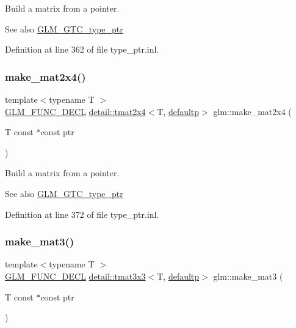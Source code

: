 Build a matrix from a pointer. \begin{DoxySeeAlso}{See also}
\hyperlink{group__gtc__type__ptr}{G\+L\+M\+\_\+\+G\+T\+C\+\_\+type\+\_\+ptr} 
\end{DoxySeeAlso}


Definition at line 362 of file type\+\_\+ptr.\+inl.

\mbox{\label{group__gtc__type__ptr_ga174a43e8913682834de9cd918e36df25}} 
\subsubsection{\texorpdfstring{make\+\_\+mat2x4()}{make\_mat2x4()}}
{\footnotesize\ttfamily template$<$typename T $>$ \\
\hyperlink{setup_8hpp_ab2d052de21a70539923e9bcbf6e83a51}{G\+L\+M\+\_\+\+F\+U\+N\+C\+\_\+\+D\+E\+CL} \hyperlink{structglm_1_1detail_1_1tmat2x4}{detail\+::tmat2x4}$<$T, \hyperlink{namespaceglm_a0f04f086094c747d227af4425893f545a9d21ccd8b5a009ec7eb7677befc3bf51}{defaultp}$>$ glm\+::make\+\_\+mat2x4 (\begin{DoxyParamCaption}\item[{T const $\ast$const}]{ptr }\end{DoxyParamCaption})}

Build a matrix from a pointer. \begin{DoxySeeAlso}{See also}
\hyperlink{group__gtc__type__ptr}{G\+L\+M\+\_\+\+G\+T\+C\+\_\+type\+\_\+ptr} 
\end{DoxySeeAlso}


Definition at line 372 of file type\+\_\+ptr.\+inl.

\mbox{\label{group__gtc__type__ptr_gae50ecac46eb8771fb074e310b602bf53}} 
\subsubsection{\texorpdfstring{make\+\_\+mat3()}{make\_mat3()}}
{\footnotesize\ttfamily template$<$typename T $>$ \\
\hyperlink{setup_8hpp_ab2d052de21a70539923e9bcbf6e83a51}{G\+L\+M\+\_\+\+F\+U\+N\+C\+\_\+\+D\+E\+CL} \hyperlink{structglm_1_1detail_1_1tmat3x3}{detail\+::tmat3x3}$<$T, \hyperlink{namespaceglm_a0f04f086094c747d227af4425893f545a9d21ccd8b5a009ec7eb7677befc3bf51}{defaultp}$>$ glm\+::make\+\_\+mat3 (\begin{DoxyParamCaption}\item[{T const $\ast$const}]{ptr }\end{DoxyParamCaption})}

